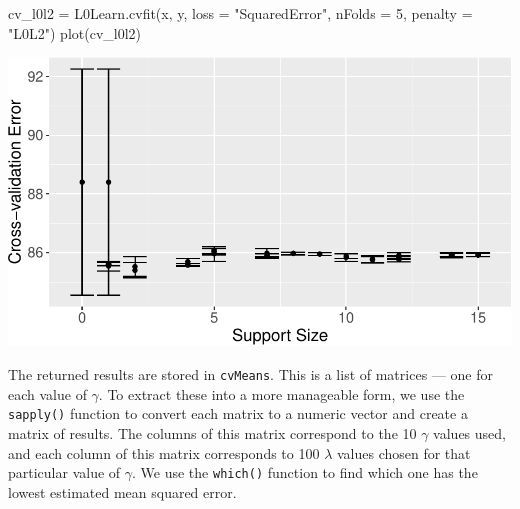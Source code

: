 \documentclass[
  letterpaper,
]{latex/krantz}
\makeatletter
\newenvironment{Shaded}{\begin{snugshade}}{\end{snugshade}}
\newcommand{\AttributeTok}[1]{\textcolor[rgb]{0.40,0.45,0.13}{#1}}
\newcommand{\CommentTok}[1]{\textcolor[rgb]{0.37,0.37,0.37}{#1}}
\newcommand{\ConstantTok}[1]{\textcolor[rgb]{0.56,0.35,0.01}{#1}}
\newcommand{\DecValTok}[1]{\textcolor[rgb]{0.68,0.00,0.00}{#1}}
\newcommand{\FunctionTok}[1]{\textcolor[rgb]{0.28,0.35,0.67}{#1}}
\newcommand{\NormalTok}[1]{\textcolor[rgb]{0.00,0.23,0.31}{#1}}
\newcommand{\OtherTok}[1]{\textcolor[rgb]{0.00,0.23,0.31}{#1}}
\newcommand{\SpecialCharTok}[1]{\textcolor[rgb]{0.37,0.37,0.37}{#1}}
\newcommand{\StringTok}[1]{\textcolor[rgb]{0.13,0.47,0.30}{#1}}
\newenvironment{kframe}{%
\medskip{}
\setlength{\fboxsep}{.8em}
 \def\at@end@of@kframe{}%
 \ifinner\ifhmode%
  \def\at@end@of@kframe{\end{minipage}}%
  \begin{minipage}{\columnwidth}%
 \fi\fi%
 \def\FrameCommand##1{\hskip\@totalleftmargin \hskip-\fboxsep
 \colorbox{shadecolor}{##1}\hskip-\fboxsep
     \hskip-\linewidth \hskip-\@totalleftmargin \hskip\columnwidth}%
 \MakeFramed {\advance\hsize-\width
   \@totalleftmargin\z@ \linewidth\hsize
   \@setminipage}}%
 {\par\unskip\endMakeFramed%
 \at@end@of@kframe}
\renewenvironment{Shaded}{\begin{kframe}}{\end{kframe}}
\makeatother
\begin{document}
\begin{Shaded}
\begin{Highlighting}[]
\NormalTok{cv\_l0l2 }\OtherTok{=} \FunctionTok{L0Learn.cvfit}\NormalTok{(x, y, }\AttributeTok{loss =} \StringTok{"SquaredError"}\NormalTok{,}
                        \AttributeTok{nFolds =} \DecValTok{5}\NormalTok{, }\AttributeTok{penalty =} \StringTok{"L0L2"}\NormalTok{)}
\FunctionTok{plot}\NormalTok{(cv\_l0l2)}
\end{Highlighting}
\end{Shaded}

\begin{center}
\includegraphics[width=1\textwidth,height=\textheight]{book/model_selection_files/figure-pdf/unnamed-chunk-21-1.pdf}
\end{center}

The returned results are stored in \texttt{cvMeans}. This is a list of
matrices --- one for each value of \(\gamma\). To extract these into a
more manageable form, we use the \texttt{sapply()} function to convert
each matrix to a numeric vector and create a matrix of results. The
columns of this matrix correspond to the 10 \(\gamma\) values used, and
each column of this matrix corresponds to 100 \(\lambda\) values chosen
for that particular value of \(\gamma\). We use the \texttt{which()}
function to find which one has the lowest estimated mean squared error.

\begin{Shaded}
\end{Shaded}
\end{document}
